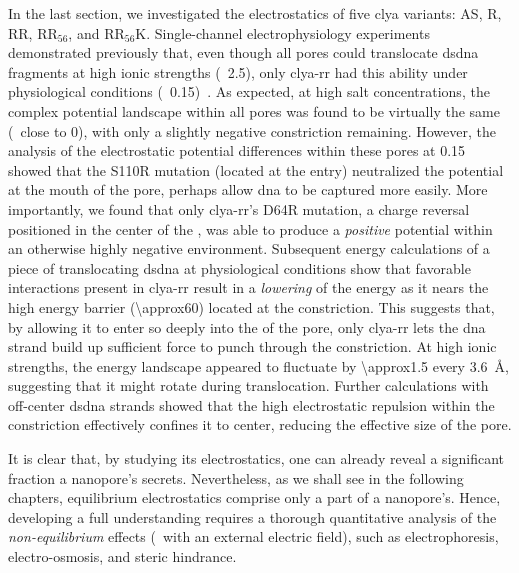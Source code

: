 In the last section, we investigated the electrostatics of five \gls{clya} variants: AS, R, RR, RR$_56$, and
RR$_56$K. Single-channel electrophysiology experiments demonstrated previously that, even though all pores
could translocate \gls{dsdna} fragments at high ionic strengths (\eg~\SI{2.5}{\Molar}), only \gls{clya-rr} had
this ability under physiological conditions (\eg~\SI{0.15}{\Molar})~\cite{Franceschini-2016}. As expected, at
high salt concentrations, the complex potential landscape within all pores was found to be virtually the same
(\ie~close to 0), with only a slightly negative constriction remaining. However, the analysis of the
electrostatic potential differences within these pores at \SI{0.15}{\Molar} showed that the S110R mutation
(located at the \cis{} entry) neutralized the potential at the mouth of the pore, perhaps allow \gls{dna} to
be captured more easily. More importantly, we found that only \gls{clya-rr}'s D64R mutation, a charge reversal
positioned in the center of the \lumen{}, was able to produce a \emph{positive} potential within an otherwise
highly negative environment. Subsequent energy calculations of a piece of translocating \gls{dsdna} at
physiological conditions show that favorable interactions present in \gls{clya-rr} result in a \emph{lowering}
of the energy as it nears the high energy barrier (\SI{\approx60}{\kT}) located at the constriction. This
suggests that, by allowing it to enter so deeply into the \lumen{} of the pore, only \gls{clya-rr} lets the
\gls{dna} strand build up sufficient force to punch through the constriction. At high ionic strengths, the
energy landscape appeared to fluctuate by \SI{\approx1.5}{\kbt} every \SI{3.6}{\angstrom}, suggesting that it
might rotate during translocation. Further calculations with off-center \gls{dsdna} strands showed that the
high electrostatic repulsion within the constriction effectively confines it to center, reducing the effective
size of the pore.

It is clear that, by studying its electrostatics, one can already reveal a significant fraction a nanopore's
secrets. Nevertheless, as we shall see in the following chapters, equilibrium electrostatics comprise only a
part of a nanopore's. Hence, developing a full understanding requires a thorough quantitative analysis of the
\emph{non-equilibrium} effects (\ie~with an external electric field), such as electrophoresis,
electro-osmosis, and steric hindrance.



\cleardoublepage

